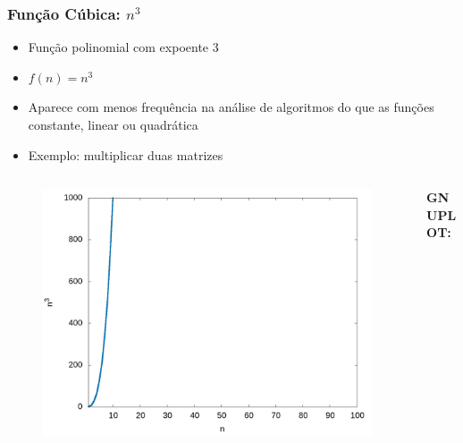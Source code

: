 \documentclass[aspectratio=169]{beamer}
\begin{document}
\begin{frame}\frametitle{Função Cúbica: $n^3$}
\begin{itemize}
	\item Função polinomial com expoente 3
	\item $f(n) = n^3$
	\item Aparece com menos frequência na análise de algoritmos do que as funções constante, linear ou quadrática
	\item Exemplo: multiplicar duas matrizes
\end{itemize}
\vspace{-5mm}
\begin{columns}[T]
\begin{column}{0.6\linewidth}
\begin{figure}[h]
	\centering
	\includegraphics[height=0.5\paperheight]{graficos/n^3.jpg}
\end{figure}
\end{column}
\begin{column}{0.4\linewidth}
\vspace{5mm}
{\fontsize{0}{4}\selectfont{}\textbf{GNUPLOT:}

}
\end{column}
\end{columns}
\end{frame}
\end{document}
